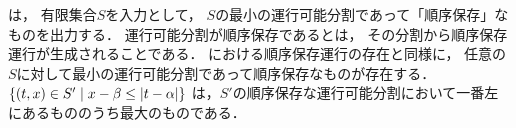{\setPartitionAlgorithm}は，
有限集合$S$を入力として，
$S$の最小の運行可能分割であって「順序保存」なものを出力する．
運行可能分割が順序保存であるとは，
その分割から順序保存運行が生成されることである．
{\graphLine}における順序保存運行の存在と同様に，
任意の$S$に対して最小の運行可能分割であって順序保存なものが存在する．
$\{ (t, x) \in S' \mid x - \beta \leq \lvert{t - \alpha}\rvert \}$
は，$S'$の順序保存な運行可能分割において一番左にあるもののうち最大のものである．



